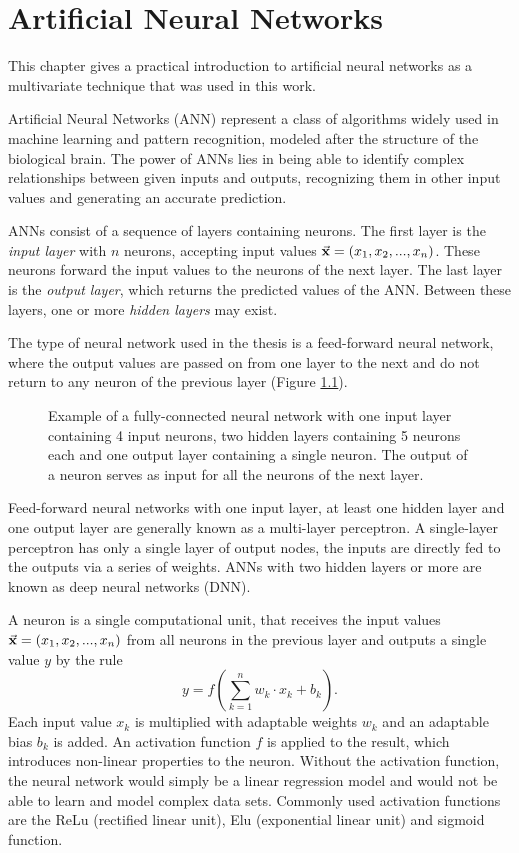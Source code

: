 \chapter{Artificial Neural Networks}
\label{ch:nn_mva}
This chapter gives a practical introduction to artificial neural networks as a multivariate technique that was used in this work.

Artificial Neural Networks (ANN) represent a class of algorithms widely used in machine learning and pattern recognition, modeled after the structure of the biological brain. The power of ANNs lies in being able to identify complex relationships between given inputs and outputs, recognizing them in other input values and generating an accurate prediction.

ANNs consist of a sequence of layers containing neurons. The first layer is the \emph{input layer} with $n$ neurons, accepting input values $\va{x}=(x_1,x_2,...,x_n)$. These neurons forward the input values to the neurons of the next layer. The last layer is the \emph{output layer}, which returns the predicted values of the ANN. Between these layers, one or more \emph{hidden layers} may exist.

The type of neural network used in the thesis is a feed-forward neural network, where the output values are passed on from one layer to the next and do not return to any neuron of the previous layer (Figure \ref{fig:neural_network}).

\begin{figure}[h]
    \centering
    
    \caption{Example of a fully-connected neural network with one input layer containing 4 input neurons, two hidden layers containing 5 neurons each and one output layer containing a single neuron. The output of a neuron serves as input for all the neurons of the next layer.}
    \label{fig:neural_network}
\end{figure}

Feed-forward neural networks with one input layer, at least one hidden layer and one output layer are generally known as a multi-layer perceptron. A single-layer perceptron has only a single layer of output nodes, the inputs are directly fed to the outputs via a series of weights. ANNs with two hidden layers or more are known as deep neural networks (DNN).

A neuron is a single computational unit, that receives the input values $\va{x}=(x_1,x_2,...,x_n)$ from all neurons in the previous layer and outputs a single value $y$ by the rule
\begin{equation}
    y=f\left( \sum_{k=1}^{n} w_k \cdot x_k + b_k \right).
\end{equation}
Each input value $x_k$ is multiplied with adaptable weights $w_k$ and an adaptable bias $b_k$ is added. An activation function $f$ is applied to the result, which introduces non-linear properties to the neuron. Without the activation function, the neural network would simply be a linear regression model and would not be able to learn and model complex data sets. Commonly used activation functions are the ReLu (rectified linear unit), Elu (exponential linear unit) and sigmoid function.

